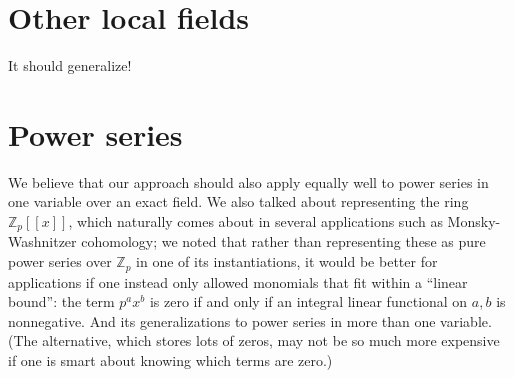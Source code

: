 \documentclass[12pt]{amsart}
\newcommand{\Z}{\mathbb Z}
\begin{document}
\section{Other local fields}

It should generalize!

\section{Power series}

We believe that our approach should also apply equally well to power series in one variable over an exact field.  We also talked about representing the ring $\Z_p[[x]]$, which naturally comes about in several applications such as Monsky-Washnitzer cohomology; we noted that rather than representing these as pure power series over $\Z_p$ in one of its instantiations, it would be better for applications if one instead only allowed monomials that fit within a ``linear bound'': the term $p^a x^b$ is zero if and only if an integral linear functional on $a,b$ is nonnegative.  And its generalizations to power series in more than one variable.  (The alternative, which stores lots of zeros, may not be so much more expensive if one is smart about knowing which terms are zero.)
\end{document}
